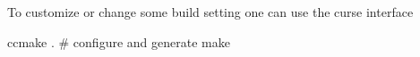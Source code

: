 To customize or change some build setting one can use the \cmake curse interface
\ccmake
\begin{unixcom}
  ccmake . # configure and generate
  make
\end{unixcom}

















